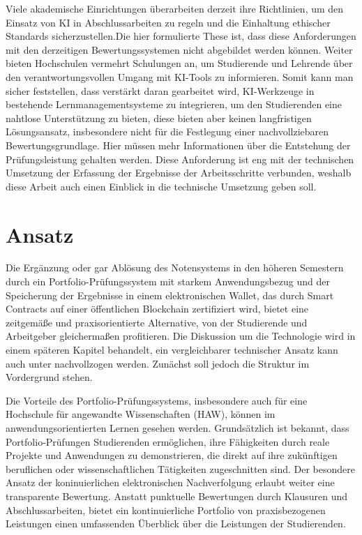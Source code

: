 \documentclass[conference]{IEEEtran}
\begin{document}
Viele akademische Einrichtungen überarbeiten derzeit ihre \cite{mrass2023chatgpt}Richtlinien, um den Einsatz von KI in Abschlussarbeiten zu regeln und die Einhaltung ethischer Standards sicherzustellen.Die hier formulierte These ist, dass diese Anforderungen mit den derzeitigen Bewertungssystemen nicht abgebildet werden können. Weiter bieten Hochschulen vermehrt Schulungen an, um Studierende und Lehrende über den verantwortungsvollen Umgang mit KI-Tools zu informieren. Somit kann man sicher feststellen, dass verstärkt daran gearbeitet wird, KI-Werkzeuge in bestehende Lernmanagementsysteme zu integrieren, um den Studierenden eine nahtlose Unterstützung zu bieten, diese bieten aber keinen langfristigen Lösungsansatz, insbesondere nicht für die Festlegung einer nachvollziebaren Bewertungsgrundlage. Hier müssen mehr Informationen über die Entstehung der Prüfungsleistung gehalten werden.
Diese Anforderung ist eng mit der technischen Umsetzung der Erfassung der Ergebnisse der Arbeitsschritte verbunden, weshalb diese Arbeit auch einen Einblick in die technische Umsetzung geben soll. 

\section{Ansatz}

Die Ergänzung oder gar Ablösung des Notensystems in den höheren Semestern durch ein Portfolio-Prüfungssystem mit starkem Anwendungsbezug und der Speicherung der Ergebnisse in einem elektronischen Wallet, das durch Smart Contracts auf einer öffentlichen Blockchain zertifiziert wird, bietet eine zeitgemäße und praxisorientierte Alternative, von der Studierende und Arbeitgeber gleichermaßen profitieren. Die Diskussion um die Technologie wird in einem späteren Kapitel behandelt, ein vergleichbarer technischer Ansatz kann auch unter \cite{Idee} nachvollzogen werden. Zunächst soll jedoch die Struktur im Vordergrund stehen. 

Die Vorteile des Portfolio-Prüfungssystems, insbesondere auch für eine Hochschule für angewandte Wissenschaften (HAW), können im anwendungsorientierten Lernen gesehen werden. Grundsätzlich ist bekannt, dass Portfolio-Prüfungen Studierenden ermöglichen, ihre Fähigkeiten durch reale Projekte und Anwendungen zu demonstrieren, die direkt auf ihre zukünftigen beruflichen oder wissenschaftlichen Tätigkeiten zugeschnitten sind. Der besondere Ansatz der koninuierlichen elektronischen Nachverfolgung erlaubt weiter eine transparente Bewertung. Anstatt punktuelle Bewertungen durch Klausuren und Abschlussarbeiten, bietet ein kontinuierliche Portfolio von praxisbezogenen Leistungen einen umfassenden Überblick über die Leistungen der Studierenden.
\end{document}
